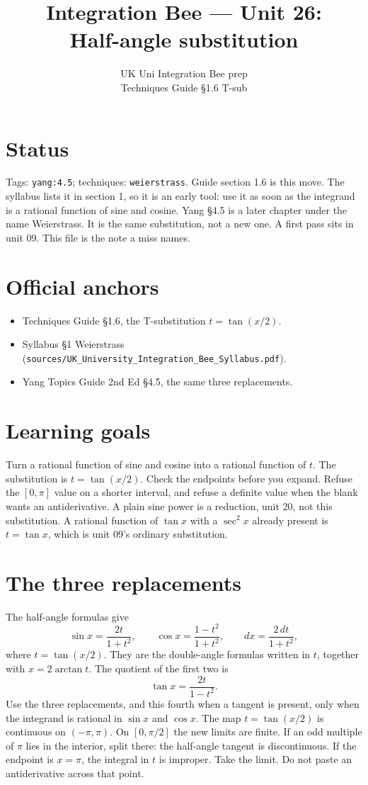 
\title{Integration Bee --- Unit 26:\\ Half-angle substitution}
\author{UK Uni Integration Bee prep\\ Techniques Guide \S1.6 T-sub}
\date{}

\maketitle
\section*{Status}
Tags: \texttt{yang:4.5}; techniques: \texttt{weierstrass}.
Guide section 1.6 is this move. The syllabus lists it in section 1, so it is an early tool: use it as soon as the integrand is a rational function of sine and cosine. Yang \S4.5 is a later chapter under the name Weierstrass. It is the same substitution, not a new one. A first pass sits in unit 09. This file is the note a miss names.
\section{Official anchors}
\begin{itemize}
\item Techniques Guide \S1.6, the T-substitution $t=\tan(x/2)$.
\item Syllabus \S1 Weierstrass (\texttt{sources/UK\_University\_Integration\_Bee\_Syllabus.pdf}).
\item Yang Topics Guide 2nd Ed \S4.5, the same three replacements.
\end{itemize}
\section{Learning goals}
Turn a rational function of sine and cosine into a rational function of $t$.
The substitution is $t=\tan(x/2)$. Check the endpoints before you expand. Refuse the $[0,\pi]$ value on a shorter interval, and refuse a definite value when the blank wants an antiderivative. A plain sine power is a reduction, unit 20, not this substitution. A rational function of $\tan x$ with a $\sec^2 x$ already present is $t=\tan x$, which is unit 09's ordinary substitution.

\section{The three replacements}
The half-angle formulas give
\[
\sin x=\frac{2t}{1+t^2},\qquad
\cos x=\frac{1-t^2}{1+t^2},\qquad
dx=\frac{2\,dt}{1+t^2},
\]
where $t=\tan(x/2)$. They are the double-angle formulas written in $t$, together with $x=2\arctan t$. The quotient of the first two is
\[
\tan x=\frac{2t}{1-t^2}.
\]
Use the three replacements, and this fourth when a tangent is present, only when the integrand is rational in $\sin x$ and $\cos x$. The map $t=\tan(x/2)$ is continuous on $(-\pi,\pi)$. On $[0,\pi/2]$ the new limits are finite. If an odd multiple of $\pi$ lies in the interior, split there: the half-angle tangent is discontinuous. If the endpoint is $x=\pi$, the integral in $t$ is improper. Take the limit. Do not paste an antiderivative across that point.

